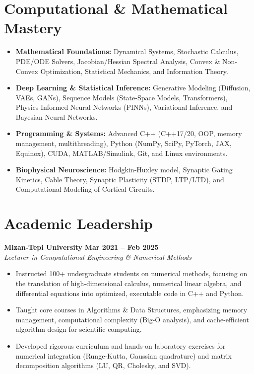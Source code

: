 \documentclass[10pt, letterpaper]{article}
\begin{document}
\section{Computational \& Mathematical Mastery}
\begin{itemize}
    \item \textbf{Mathematical Foundations:} Dynamical Systems, Stochastic Calculus, PDE/ODE Solvers, Jacobian/Hessian Spectral Analysis, Convex \& Non-Convex Optimization, Statistical Mechanics, and Information Theory.
    \item \textbf{Deep Learning \& Statistical Inference:} Generative Modeling (Diffusion, VAEs, GANs), Sequence Models (State-Space Models, Transformers), Physics-Informed Neural Networks (PINNs), Variational Inference, and Bayesian Neural Networks.
    \item \textbf{Programming \& Systems:} Advanced C++ (C++17/20, OOP, memory management, multithreading), Python (NumPy, SciPy, PyTorch, JAX, Equinox), CUDA, MATLAB/Simulink, Git, and Linux environments.
    \item \textbf{Biophysical Neuroscience:} Hodgkin-Huxley model, Synaptic Gating Kinetics, Cable Theory, Synaptic Plasticity (STDP, LTP/LTD), and Computational Modeling of Cortical Circuits.
\end{itemize}

\section{Academic Leadership}
\textbf{Mizan-Tepi University} \hfill \textbf{Mar 2021 -- Feb 2025} \\
\textit{Lecturer in Computational Engineering \& Numerical Methods}
\begin{itemize}
    \item Instructed 100+ undergraduate students on numerical methods, focusing on the translation of high-dimensional calculus, numerical linear algebra, and differential equations into optimized, executable code in C++ and Python.
    \item Taught core courses in Algorithms \& Data Structures, emphasizing memory management, computational complexity (Big-O analysis), and cache-efficient algorithm design for scientific computing.
    \item Developed rigorous curriculum and hands-on laboratory exercises for numerical integration (Runge-Kutta, Gaussian quadrature) and matrix decomposition algorithms (LU, QR, Cholesky, and SVD).
\end{itemize}
\end{document}
